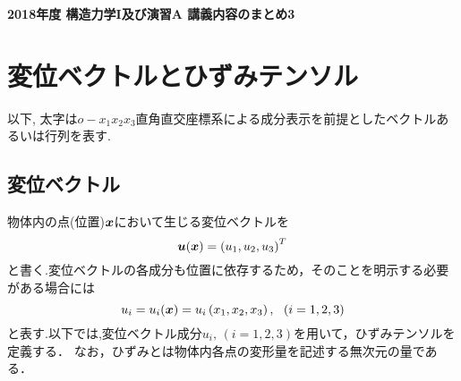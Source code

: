 \documentclass[10pt,a4j]{jarticle}
\newlength{\minitwocolumn}
\begin{document}
\newcommand{\fat}[1]{\mbox{\boldmath $#1$}}
\newcommand{\D}{\partial}
\newcommand{\w}{\omega}
\newcommand{\ga}{\alpha}
\newcommand{\gb}{\beta}
\newcommand{\gx}{\xi}
\newcommand{\gz}{\zeta}
\newcommand{\vhat}[1]{\hat{\fat{#1}}}
\newcommand{\spc}{\vspace{0.7\baselineskip}}
\newcommand{\halfspc}{\vspace{0.3\baselineskip}}

\newcommand{\twofig}[2]
 {
   \begin{figure}
     \begin{minipage}[t]{\minitwocolumn}
         \begin{center}   #1
         \end{center}
     \end{minipage}
         \hspace{\columnsep}
     \begin{minipage}[t]{\minitwocolumn}
         \begin{center} #2
         \end{center}
     \end{minipage}
   \end{figure}
 }
\begin{center}
	{\Large \bf 2018年度 構造力学I及び演習A 講義内容のまとめ3} \\
\end{center}
\section{変位ベクトルとひずみテンソル}
以下, 太字は$o-x_1x_2x_3$直角直交座標系による成分表示を前提としたベクトルあるいは行列を表す.
\subsection{変位ベクトル}
物体内の点(位置)$\fat{x}$において生じる変位ベクトルを
\begin{equation}
	\fat{u}(\fat{x})=\left( u_1, u_2, u_3 \right)^T
	\label{eqn:uvec}
\end{equation}
と書く.変位ベクトルの各成分も位置に依存するため，そのことを明示する必要がある場合には
\begin{equation}
	u_i=u_i(\fat{x})=u_i\left(x_1, x_2, x_3\right), \ \ (i=1,2,3)
	\label{eqn:uvec_compo}
\end{equation}
と表す.以下では,変位ベクトル成分$u_i,\,(i=1,2,3)$を用いて，ひずみテンソルを定義する．
なお，ひずみとは物体内各点の変形量を記述する無次元の量である．
%
\end{document}
